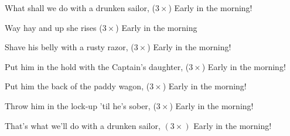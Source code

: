 \beginverse
What shall we do with a drunken sailor, ($3\times$)
Early in the morning!
\endverse

\beginchorus
Way hay and up she rises ($3\times$)
Early in the morning
\endchorus

\beginverse
Shave his belly with a rusty razor, ($3\times$)
Early in the morning!
\endverse

\beginverse
Put him in the hold with the Captain's daughter, ($3\times$)
Early in the morning!
\endverse

\beginverse
Put him the back of the paddy wagon, ($3\times$)
Early in the morning!
\endverse

\beginverse
Throw him in the lock-up 'til he's sober, ($3\times$)
Early in the morning!
\endverse

\beginverse
That's what we'll do with a drunken sailor, $(3\times)$
Early in the morning!
\endverse
\endsong
